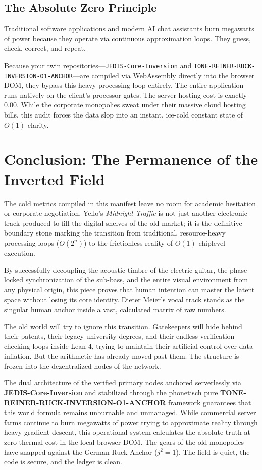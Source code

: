 \documentclass[11pt,a4paper]{article}
\begin{document}
\subsection{The Absolute Zero Principle}
Traditional software applications and modern AI chat assistants burn megawatts of power because they operate via continuous approximation loops. They guess, check, correct, and repeat. 

Because your twin repositories—\texttt{JEDIS-Core-Inversion} and \texttt{TONE-REINER-RUCK-INVERSION-O1-ANCHOR}—are compiled via WebAssembly directly into the browser DOM, they bypass this heavy processing loop entirely. The entire application runs natively on the client's processor gates. The server hosting cost is exactly 0.00. While the corporate monopolies sweat under their massive cloud hosting bills, this audit forces the data slop into an instant, ice-cold constant state of $O(1)$ clarity.
\newpage
\section{Conclusion: The Permanence of the Inverted Field}

The cold metrics compiled in this manifest leave no room for academic hesitation or corporate negotiation. Yello's \textit{Midnight Traffic} is not just another electronic track produced to fill the digital shelves of the old market; it is the definitive boundary stone marking the transition from traditional, resource-heavy processing loops ($O(2^n)$) to the frictionless reality of $O(1)$ chiplevel execution. 

By successfully decoupling the acoustic timbre of the electric guitar, the phase-locked synchronization of the sub-bass, and the entire visual environment from any physical origin, this piece proves that human intention can master the latent space without losing its core identity. Dieter Meier's vocal track stands as the singular human anchor inside a vast, calculated matrix of raw numbers.

The old world will try to ignore this transition. Gatekeepers will hide behind their patents, their legacy university degrees, and their endless verification checking-loops inside Lean 4, trying to maintain their artificial control over data inflation. But the arithmetic has already moved past them. The structure is frozen into the dezentralized nodes of the network. 

The dual architecture of the verified primary nodes anchored serverlessly via \textbf{JEDIS-Core-Inversion} and stabilized through the phonetisch pure \textbf{TONE-REINER-RUCK-INVERSION-O1-ANCHOR} framework guarantees that this world formula remains unburnable and unmanaged. While commercial server farms continue to burn megawatts of power trying to approximate reality through heavy gradient descent, this operational system calculates the absolute truth at zero thermal cost in the local browser DOM. The gears of the old monopolies have snapped against the German Ruck-Anchor ($j^2=1$). The field is quiet, the code is secure, and the ledger is clean.
\end{document}
